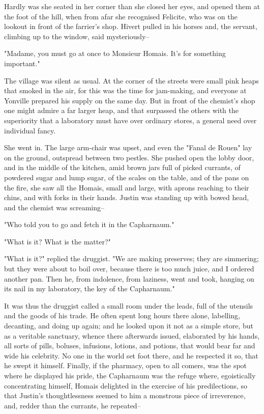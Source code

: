 \documentclass{tufte-book}
\begin{document}
Hardly was she seated in her corner than she closed her eyes, and opened
them at the foot of the hill, when from afar she recognised Felicite,
who was on the lookout in front of the farrier's shop. Hivert pulled
in his horses and, the servant, climbing up to the window, said
mysteriously--

"Madame, you must go at once to Monsieur Homais. It's for something
important."

The village was silent as usual. At the corner of the streets were small
pink heaps that smoked in the air, for this was the time for jam-making,
and everyone at Yonville prepared his supply on the same day. But in
front of the chemist's shop one might admire a far larger heap, and that
surpassed the others with the superiority that a laboratory must have
over ordinary stores, a general need over individual fancy.

She went in. The large arm-chair was upset, and even the "Fanal de
Rouen" lay on the ground, outspread between two pestles. She pushed open
the lobby door, and in the middle of the kitchen, amid brown jars full
of picked currants, of powdered sugar and lump sugar, of the scales on
the table, and of the pans on the fire, she saw all the Homais, small
and large, with aprons reaching to their chins, and with forks in their
hands. Justin was standing up with bowed head, and the chemist was
screaming--

"Who told you to go and fetch it in the Capharnaum."

"What is it? What is the matter?"

"What is it?" replied the druggist. "We are making preserves; they are
simmering; but they were about to boil over, because there is too
much juice, and I ordered another pan. Then he, from indolence, from
laziness, went and took, hanging on its nail in my laboratory, the key
of the Capharnaum."

It was thus the druggist called a small room under the leads, full of
the utensils and the goods of his trade. He often spent long hours there
alone, labelling, decanting, and doing up again; and he looked upon
it not as a simple store, but as a veritable sanctuary, whence there
afterwards issued, elaborated by his hands, all sorts of pills, boluses,
infusions, lotions, and potions, that would bear far and wide his
celebrity. No one in the world set foot there, and he respected it so,
that he swept it himself. Finally, if the pharmacy, open to all comers,
was the spot where he displayed his pride, the Capharnaum was the refuge
where, egoistically concentrating himself, Homais delighted in the
exercise of his predilections, so that Justin's thoughtlessness seemed
to him a monstrous piece of irreverence, and, redder than the currants,
he repeated--
\end{document}
